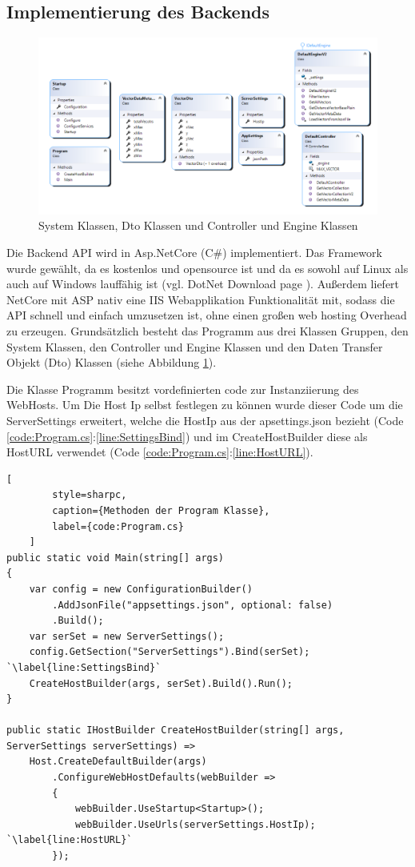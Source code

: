 \subsection{Implementierung des Backends}

\begin{figure}[H]
	\centering
	\includegraphics[width=\linewidth]{images/backend/classDiagram}
	\caption{System Klassen, Dto Klassen und Controller und Engine Klassen}
	\label{fig:ClassDiagram}
\end{figure}

Die Backend API wird in Asp.NetCore (C\#) implementiert.
Das Framework wurde gewählt, da es kostenlos und opensource
ist und da es sowohl auf Linux als auch auf Windows lauffähig ist
(vgl. DotNet Download page \cite{DotNetDownloadPage}).
Außerdem liefert NetCore mit ASP nativ eine IIS Webapplikation
Funktionalität mit, sodass die API schnell und einfach umzusetzen ist,
ohne einen großen web hosting Overhead zu erzeugen. Grundsätzlich
besteht das Programm aus drei Klassen Gruppen, den System Klassen,
den Controller und Engine Klassen und den Daten Transfer Objekt (Dto)
Klassen (siehe Abbildung \ref{fig:ClassDiagram}).

Die Klasse Programm besitzt vordefinierten code zur Instanziierung
des WebHosts. Um Die Host Ip selbst festlegen zu können wurde dieser
Code um die ServerSettings erweitert, welche die HostIp aus der
apsettings.json bezieht
(Code \ref{code:Program.cs}:\ref{line:SettingsBind}) und im
CreateHostBuilder diese als HostURL verwendet
(Code \ref{code:Program.cs}:\ref{line:HostURL}).

\begin{codeblock}
	\begin{lstlisting}[
		style=sharpc,
		caption={Methoden der Program Klasse},
		label={code:Program.cs}
	]
public static void Main(string[] args)
{
	var config = new ConfigurationBuilder()
		.AddJsonFile("appsettings.json", optional: false)
		.Build();
	var serSet = new ServerSettings();
	config.GetSection("ServerSettings").Bind(serSet); `\label{line:SettingsBind}`
	CreateHostBuilder(args, serSet).Build().Run();
}

public static IHostBuilder CreateHostBuilder(string[] args, ServerSettings serverSettings) =>
	Host.CreateDefaultBuilder(args)
		.ConfigureWebHostDefaults(webBuilder =>
		{
			webBuilder.UseStartup<Startup>();
			webBuilder.UseUrls(serverSettings.HostIp); `\label{line:HostURL}`
		});
	\end{lstlisting}
\end{codeblock}

